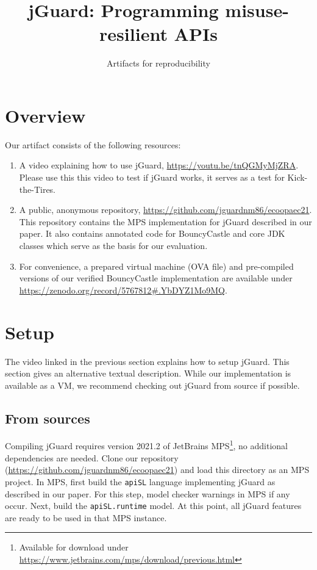 \documentclass[parskip=full]{scrreprt}
\title{jGuard: Programming misuse-resilient APIs}
\subtitle{Artifacts for reproducibility}
\begin{document}
\maketitle
\setcounter{chapter}{1}

\section{Overview}

Our artifact consists of the following resources:

\begin{enumerate}
 \item A video explaining how to use jGuard, \url{https://youtu.be/tnQGMyMjZRA}.
 Please use this this video to test if jGuard works, it serves as a test for Kick-the-Tires.
 \item A public, anonymous repository, \url{https://github.com/jguardnm86/ecoopaec21}.
 This repository contains the MPS implementation for jGuard described in our paper.
 It also contains annotated code for BouncyCastle and core JDK classes which serve as the
 basis for our evaluation.
 \item For convenience, a prepared virtual machine (OVA file) and pre-compiled versions of our verified BouncyCastle implementation are available under \url{https://zenodo.org/record/5767812#.YbDYZ1Mo9MQ}.
\end{enumerate}

\section{Setup}

The video linked in the previous section explains how to setup jGuard. This section gives
an alternative textual description.
While our implementation is available as a VM, we recommend checking out jGuard from source if
possible.

\subsection{From sources}

Compiling jGuard requires version 2021.2 of JetBrains MPS\footnote{Available for download under \url{https://www.jetbrains.com/mps/download/previous.html}}, no additional dependencies are needed.
Clone our repository (\url{https://github.com/jguardnm86/ecoopaec21}) and load this
directory as an MPS project.
In MPS, first build the \texttt{apiSL} language implementing jGuard as described in our paper.
For this step, model checker warnings in MPS if any occur.
Next, build the \texttt{apiSL.runtime} model. At this point, all jGuard features are ready to be used in that MPS instance.
\end{document}
